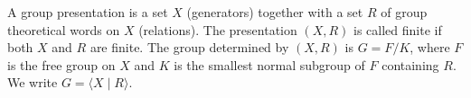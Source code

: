 A group presentation is a set $X$ (generators) together with a set $R$ of group theoretical words on $X$ (relations). The presentation $(X, R)$ is called finite if both $X$ and $R$ are finite. The group determined by $(X, R)$ is $G = F/K$, where $F$ is the free group on $X$ and $K$ is the smallest normal subgroup of $F$ containing $R$. We write $G = \langle X \mid R \rangle$.
